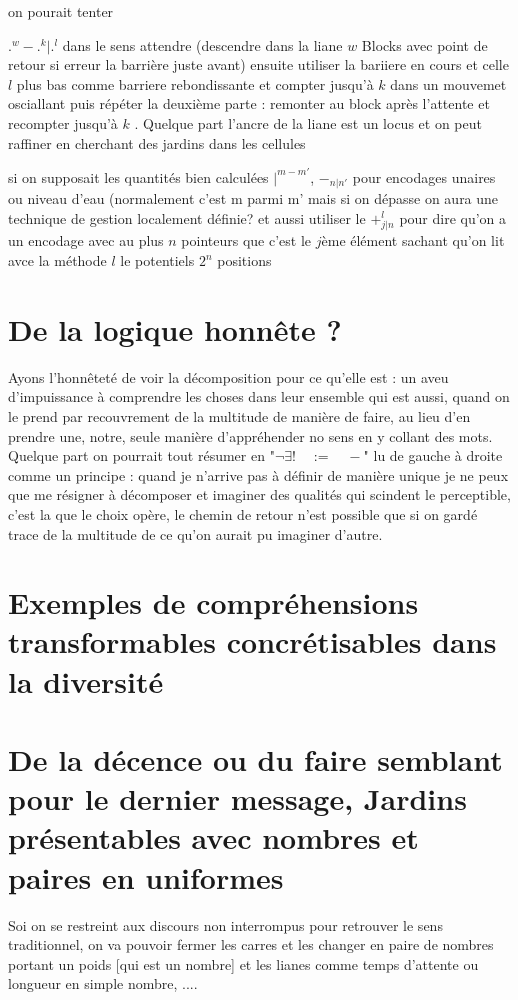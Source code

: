 \documentclass{article}
\begin{document}
on pourait tenter 

$.^w-.^k| .^l$  dans le sens  attendre (descendre dans la liane $w$ Blocks avec point de retour si erreur la barrière juste avant) ensuite utiliser la bariiere en cours et celle $l$ plus bas comme barriere rebondissante et compter jusqu'à $k$ dans un mouvemet osciallant puis répéter la deuxième parte : remonter au block après l'attente  et recompter jusqu'à $k$ . Quelque part l'ancre de la liane est un locus et on peut raffiner en cherchant  des jardins dans les cellules

si on supposait les quantités bien calculées $|^{m-m'}$, $-_{n|n'}$ pour encodages unaires ou niveau d'eau (normalement c'est m parmi m' mais si on dépasse on aura une technique de gestion localement définie?
 et aussi  utiliser le $+^l_{j|n}$ pour dire qu'on a un encodage avec au plus $n$ pointeurs que c'est le $j$ème élément sachant qu'on lit avce la méthode $l$ le potentiels $2^n$ positions

 \section{De la logique honnête ? }
 Ayons l'honnêteté de voir la décomposition pour ce qu'elle est : un aveu d'impuissance à comprendre les choses dans leur ensemble 
 qui est aussi, quand on le prend par recouvrement de la multitude de manière de faire, au lieu d'en prendre une, notre, seule manière d'appréhender no sens en y collant des mots. Quelque part on pourrait tout résumer en "$\neg \exists ! \quad := \quad -$" lu de gauche à droite  comme un principe : quand je n'arrive pas à définir de manière unique je ne peux que me résigner à décomposer et imaginer des qualités qui scindent le perceptible, c'est la que le choix opère, le chemin de retour n'est possible que si on gardé trace de la multitude de ce qu'on aurait pu imaginer d'autre.
\section{Exemples de compréhensions transformables concrétisables dans la diversité}

\section{De la décence ou  du faire semblant pour le dernier message, Jardins présentables avec nombres et paires en uniformes}
Soi on se restreint  aux discours non interrompus pour retrouver le sens traditionnel, on va pouvoir fermer les carres et les changer en paire de nombres portant  un poids [qui est un nombre] et les lianes comme temps d'attente ou longueur en simple nombre, ....
\end{document}
